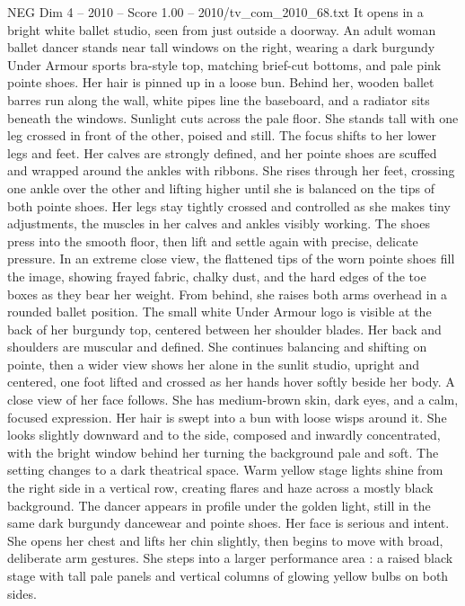 \begin{textsample}{NEG Dim 4 – 2010 – Score 1.00 – 2010/tv\_com\_2010\_68.txt}  \label{ex:f4_neg_075}
It opens in a bright white ballet studio, seen from just outside a doorway.
An adult woman ballet dancer stands near tall windows on the right, wearing a dark burgundy Under Armour sports bra-style top, matching brief-cut bottoms, and pale pink pointe shoes.
Her hair is pinned up in a loose bun.
Behind her, wooden ballet barres run along the wall, white pipes line the baseboard, and a radiator sits beneath the windows.
Sunlight cuts across the pale floor.
She stands tall with one leg crossed in front of the other, poised and still.
The focus shifts to her lower legs and feet.
Her calves are strongly defined, and her pointe shoes are scuffed and wrapped around the ankles with ribbons.
She rises through her feet, crossing one ankle over the other and lifting higher until she is balanced on the tips of both pointe shoes.
Her legs stay tightly crossed and controlled as she makes tiny adjustments, the muscles in her calves and ankles visibly working.
The shoes press into the smooth floor, then lift and settle again with precise, delicate pressure.
In an extreme close view, the flattened tips of the worn pointe shoes fill the image, showing frayed fabric, chalky dust, and the hard edges of the toe boxes as they bear her weight.
From behind, she raises both arms overhead in a rounded ballet position.
The small white Under Armour logo is visible at the back of her burgundy top, centered between her shoulder blades.
Her back and shoulders are muscular and defined.
She continues balancing and shifting on pointe, then a wider view shows her alone in the sunlit studio, upright and centered, one foot lifted and crossed as her hands hover softly beside her body.
A close view of her face follows.
She has medium-brown skin, dark eyes, and a calm, focused expression.
Her hair is swept into a bun with loose wisps around it.
She looks slightly downward and to the side, composed and inwardly concentrated, with the bright window behind her turning the background pale and soft.
The setting changes to a dark theatrical space.
Warm yellow stage lights shine from the right side in a vertical row, creating flares and haze across a mostly black background.
The dancer appears in profile under the golden light, still in the same dark burgundy dancewear and pointe shoes.
Her face is serious and intent.
She opens her chest and lifts her chin slightly, then begins to move with broad, deliberate arm gestures.
She steps into a larger performance area : a raised black stage with tall pale panels and vertical columns of glowing yellow bulbs on both sides.

\end{textsample}
